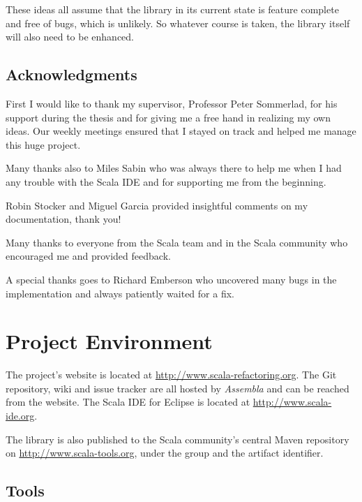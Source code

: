 \documentclass[10pt,a4paper,oneside]{scrreprt}
\begin{document}
These ideas all assume that the library in its current state is feature complete and free of bugs, which is unlikely. So whatever course is taken, the library itself will also need to be enhanced. 

\section{Acknowledgments}

First I would like to thank my supervisor, Professor Peter Sommerlad, for his support during the thesis and for giving me a free hand in realizing my own ideas. Our weekly meetings ensured that I stayed on track and helped me manage this huge project.

Many thanks also to Miles Sabin who was always there to help me when I had any trouble with the Scala IDE and for supporting me from the beginning.

Robin Stocker and Miguel Garcia provided insightful comments on my documentation, thank you!

Many thanks to everyone from the Scala team and in the Scala community who encouraged me and provided feedback. 

A special thanks goes to Richard Emberson who uncovered many bugs in the implementation and always patiently waited for a fix.

\label{end-chapter:outlook}

\appendix

\emptypage

\chapter{Project Environment} \label{chapter:project-environment}

The project's website is located at \url{http://www.scala-refactoring.org}. The Git repository, wiki and issue tracker are all hosted by \textit{Assembla} and can be reached from the website. The Scala IDE for Eclipse is located at \url{http://www.scala-ide.org}.

The library is also published to the Scala community's central Maven repository on \url{http://www.scala-tools.org}, under the  group and the   artifact identifier.

\section{Tools}
\end{document}
